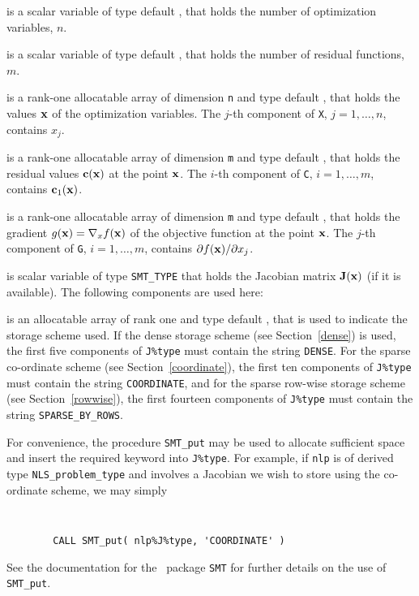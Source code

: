 \documentclass{galahad}
\newcommand{\packagename}{NLS}
\begin{document}
\begin{description}

 is a scalar variable of type default \integer,
 that holds the number of optimization variables, $n$.

 is a scalar variable of type default \integer,
 that holds the number of residual functions, $m$.



 is a rank-one allocatable array of dimension {\tt n} and type
default \realdp, that holds the values ${\mathbf{x}}$ of the optimization variables.
The $j$-th component of {\tt X}, $j = 1,  \ldots , n$, contains $x_{j}$.

 is a rank-one allocatable array of dimension {\tt m} and type
default \realdp, that holds the residual values ${\mathbf{c}}({\mathbf{x}})$
at the point ${\mathbf{x}}$. The $i$-th component of
{\tt C}, $i = 1, \ldots, m$, contains ${\mathbf{c}}_{1}({\mathbf{x}})$.

 is a rank-one allocatable array of dimension {\tt m} and type
default \realdp, that holds the gradient $g({\mathbf{x}}) = \nabla_x f({\mathbf{x}})$ of the
objective function at the point ${\mathbf{x}}$. The $j$-th component of
{\tt G}, $i = 1, \ldots, m$, contains $\partial f({\mathbf{x}})/\partial x_j$.

 is scalar variable of type {\tt SMT\_TYPE}
that holds the Jacobian matrix ${\mathbf{J}}({\mathbf{x}})$ (if it is available).
The following components are used here:

\begin{description}

 is an allocatable array of rank one and type default
\character, that
is used to indicate the storage scheme used. If the dense storage scheme
(see Section~\ref{dense}) is used,
the first five components of {\tt J\%type} must contain the
string {\tt DENSE}.
For the sparse co-ordinate scheme (see Section~\ref{coordinate}),
the first ten components of {\tt J\%type} must contain the
string {\tt COORDINATE},
and for the sparse row-wise storage scheme (see Section~\ref{rowwise}),
the first fourteen components of {\tt J\%type} must contain the
string {\tt SPARSE\_BY\_ROWS}.

For convenience, the procedure {\tt SMT\_put}
may be used to allocate sufficient space and insert the required keyword
into {\tt J\%type}.
For example, if {\tt nlp} is of derived type {\tt \packagename\_problem\_type}
and involves a Jacobian we wish to store using the co-ordinate scheme,
we may simply
{\tt
\begin{verbatim}
        CALL SMT_put( nlp%J%type, 'COORDINATE' )
\end{verbatim}
}
\noindent
See the documentation for the \galahad\ package {\tt SMT}
for further details on the use of {\tt SMT\_put}.


\end{description}
\end{description}
\end{document}
